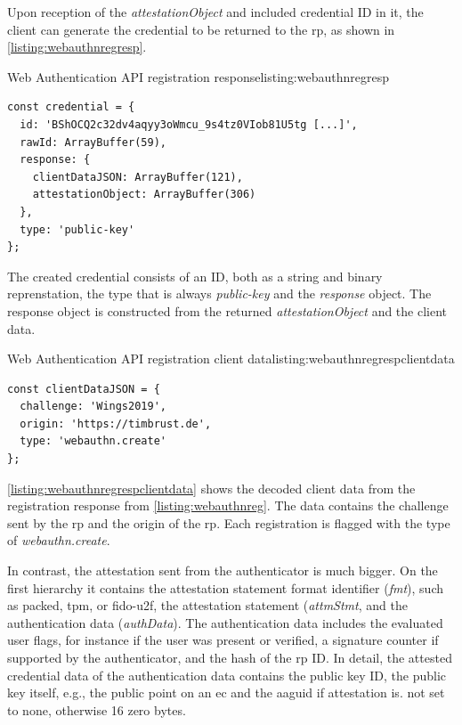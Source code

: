 Upon reception of the \textit{attestationObject} and included credential ID in it, the client can generate the credential to be returned to the \gls{rp}, as shown in \autoref{listing:webauthnregresp}.
\\
\begin{example}{Web Authentication API registration response}{listing:webauthnregresp}
\begin{verbatim}
const credential = {
  id: 'BShOCQ2c32dv4aqyy3oWmcu_9s4tz0VIob81U5tg [...]',
  rawId: ArrayBuffer(59),
  response: {
    clientDataJSON: ArrayBuffer(121),
    attestationObject: ArrayBuffer(306)
  },
  type: 'public-key'
};
\end{verbatim}
\end{example}

The created credential consists of an ID, both as a string and binary reprenstation, the type that is always \textit{public-key} and the \textit{response} object. The response object is constructed from the returned \textit{attestationObject} and the client data.
\\
\begin{example}{Web Authentication API registration client data}{listing:webauthnregrespclientdata}
\begin{verbatim}
const clientDataJSON = {
  challenge: 'Wings2019',
  origin: 'https://timbrust.de',
  type: 'webauthn.create'
};
\end{verbatim}
\end{example}

\autoref{listing:webauthnregrespclientdata} shows the decoded client data from the \wa{} registration response from \autoref{listing:webauthnreg}. The data contains the challenge sent by the \gls{rp} and the origin of the \gls{rp}. Each registration is flagged with the type of \textit{webauthn.create}.

In contrast, the attestation sent from the authenticator is much bigger. On the first hierarchy it contains the attestation statement format identifier (\textit{fmt}), such as packed, tpm, or fido-u2f, the attestation statement (\textit{attmStmt}, and the authentication data (\textit{authData}). The authentication data includes the evaluated user flags, for instance if the user was present or verified, a signature counter if supported by the authenticator, and the hash of the \gls{rp} ID. In detail, the attested credential data of the authentication data contains the public key ID, the public key itself, e.g., the public point on an \gls{ec} and the \gls{aaguid} if attestation is. not set to none, otherwise 16 zero bytes.

